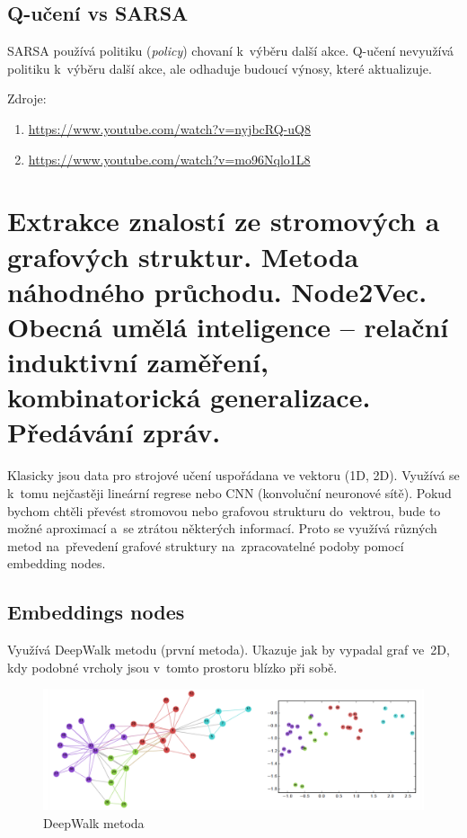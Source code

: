 \subsection{Q-učení vs SARSA}

SARSA používá politiku (\emph{policy}) chovaní k~výběru další akce.
Q-učení nevyužívá politiku k~výběru další akce, ale odhaduje budoucí výnosy, které aktualizuje.

Zdroje:
\begin{enumerate}
    \item \url{https://www.youtube.com/watch?v=nyjbcRQ-uQ8}
    \item \url{https://www.youtube.com/watch?v=mo96Nqlo1L8}
\end{enumerate}

\clearpage
\section{Extrakce znalostí ze stromových a grafových struktur. Metoda náhodného průchodu. Node2Vec. Obecná umělá inteligence – relační induktivní zaměření, kombinatorická generalizace. Předávání zpráv.}

Klasicky jsou data pro strojové učení uspořádana ve vektoru (1D, 2D). 
Využívá se k~tomu nejčastěji lineární regrese nebo CNN (konvoluční neuronové sítě). 
Pokud bychom chtěli převést stromovou nebo grafovou strukturu do~vektrou, bude to možné aproximací a~se ztrátou některých informací.
Proto se využívá různých metod na~převedení grafové struktury na~zpracovatelné podoby pomocí embedding nodes.

\subsection{Embeddings nodes}

Využívá DeepWalk metodu (první metoda). 
Ukazuje jak by vypadal graf ve~2D, kdy podobné vrcholy jsou v~tomto prostoru blízko při sobě.

\begin{figure}[ht]
    \centering
    \includegraphics[width=\textwidth]{images/11_deepwalk-graf}
    \caption{DeepWalk metoda}
\end{figure}

